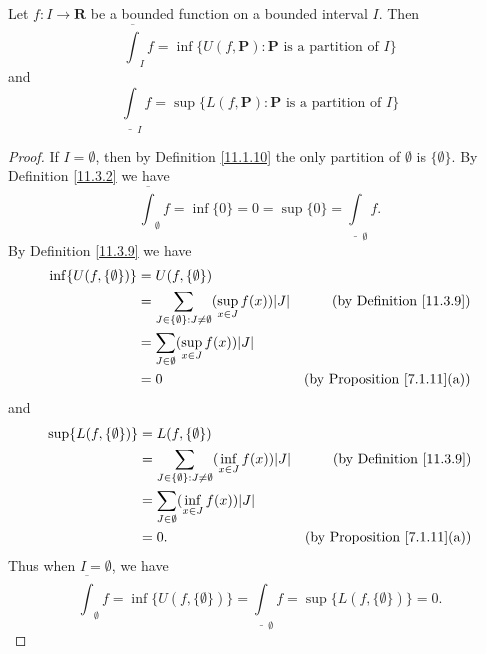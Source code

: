 \begin{proposition}\label{11.3.12}
    Let \(f : I \to \mathbf{R}\) be a bounded function on a bounded interval \(I\).
    Then
    \[
        \overline{\int}_I f = \inf \{U(f, \mathbf{P}) : \mathbf{P} \text{ is a partition of } I\}
    \]
    and
    \[
        \underline{\int}_I f = \sup \{L(f, \mathbf{P}) : \mathbf{P} \text{ is a partition of } I\}
    \]
\end{proposition}

\begin{proof}
    If \(I = \emptyset\), then by Definition \ref{11.1.10} the only partition of \(\emptyset\) is \(\{\emptyset\}\).
    By Definition \ref{11.3.2} we have
    \[
        \overline{\int}_{\emptyset} f = \inf \{0\} = 0 = \sup \{0\} = \underline{\int}_{\emptyset} f.
    \]
    By Definition \ref{11.3.9} we have
    \begin{align*}
        \inf \{U(f, \{\emptyset\})\} & = U(f, \{\emptyset\})                                                                                                    \\
                                     & = \sum_{J \in \{\emptyset\} : J \neq \emptyset} (\sup_{x \in J} f(x)) \abs*{J} & \text{(by Definition \ref{11.3.9})}     \\
                                     & = \sum_{J \in \emptyset} (\sup_{x \in J} f(x)) \abs*{J}                                                                  \\
                                     & = 0                                                                            & \text{(by Proposition \ref{7.1.11}(a))}
    \end{align*}
    and
    \begin{align*}
        \sup \{L(f, \{\emptyset\})\} & = L(f, \{\emptyset\})                                                                                                    \\
                                     & = \sum_{J \in \{\emptyset\} : J \neq \emptyset} (\inf_{x \in J} f(x)) \abs*{J} & \text{(by Definition \ref{11.3.9})}     \\
                                     & = \sum_{J \in \emptyset} (\inf_{x \in J} f(x)) \abs*{J}                                                                  \\
                                     & = 0.                                                                           & \text{(by Proposition \ref{7.1.11}(a))}
    \end{align*}
    Thus when \(I = \emptyset\), we have
    \[
        \overline{\int}_{\emptyset} f = \inf \{U(f, \{\emptyset\})\} = \underline{\int}_{\emptyset} f = \sup \{L(f, \{\emptyset\})\} = 0.
    \]


\end{proof}
